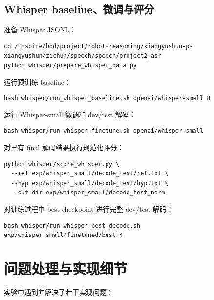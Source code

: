 \documentclass[UTF8,a4paper,12pt]{ctexart}
\begin{document}
\subsection{Whisper baseline、微调与评分}

准备 Whisper JSONL：

\begin{lstlisting}
cd /inspire/hdd/project/robot-reasoning/xiangyushun-p-xiangyushun/zichun/speech/speech/project2_asr
python whisper/prepare_whisper_data.py
\end{lstlisting}

运行预训练 baseline：

\begin{lstlisting}
bash whisper/run_whisper_baseline.sh openai/whisper-small 8
\end{lstlisting}

运行 Whisper-small 微调和 dev/test 解码：

\begin{lstlisting}
bash whisper/run_whisper_finetune.sh openai/whisper-small
\end{lstlisting}

对已有 final 解码结果执行规范化评分：

\begin{lstlisting}
python whisper/score_whisper.py \
  --ref exp/whisper_small/decode_test/ref.txt \
  --hyp exp/whisper_small/decode_test/hyp.txt \
  --out-dir exp/whisper_small/decode_test_norm
\end{lstlisting}

对训练过程中 best checkpoint 进行完整 dev/test 解码：

\begin{lstlisting}
bash whisper/run_whisper_best_decode.sh exp/whisper_small/finetuned/best 4
\end{lstlisting}

\section{问题处理与实现细节}

实验中遇到并解决了若干实现问题：
\end{document}
